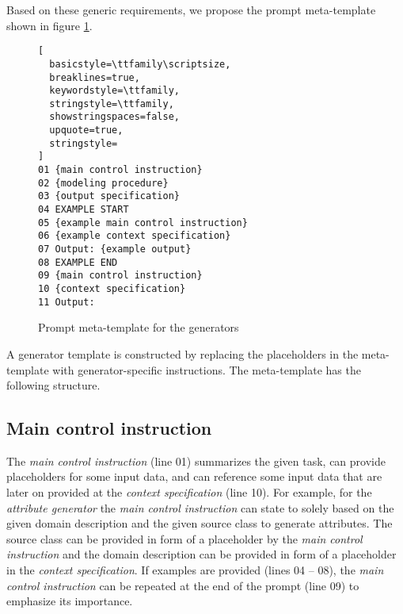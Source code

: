 Based on these generic requirements, we propose the prompt meta-template shown in figure \ref{fig:meta-templates}.

\begin{figure}[!h]
    \centering
\begin{lstlisting}[
  basicstyle=\ttfamily\scriptsize,
  breaklines=true,
  keywordstyle=\ttfamily,
  stringstyle=\ttfamily,
  showstringspaces=false,
  upquote=true,
  stringstyle=
]
01 {main control instruction}
02 {modeling procedure}
03 {output specification}
04 EXAMPLE START
05 {example main control instruction}
06 {example context specification}
07 Output: {example output}
08 EXAMPLE END
09 {main control instruction}
10 {context specification}
11 Output:
\end{lstlisting}
    \caption{\centering Prompt meta-template for the generators}
    \label{fig:meta-templates}
\end{figure}


A generator template is constructed by replacing the placeholders in the meta-template with generator-specific instructions. The meta-template has the following structure.





\subsection{Main control instruction}

The \emph{main control instruction} (line 01) summarizes the given task, can provide placeholders for some input data, and can reference some input data that are later on provided at the \emph{context specification} (line 10). For example, for the \emph{attribute generator} the \emph{main control instruction} can state to solely based on the given domain description and the given source class to generate attributes. The source class can be provided in form of a placeholder by the \emph{main control instruction} and the domain description can be provided in form of a placeholder in the \emph{context specification}. If examples are provided (lines 04 -- 08), the \emph{main control instruction} can be repeated at the end of the prompt (line 09) to emphasize its importance.


